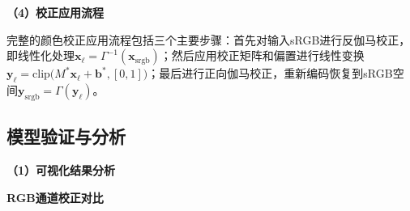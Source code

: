 \noindent\textbf{（4）校正应用流程}

完整的颜色校正应用流程包括三个主要步骤：首先对输入sRGB进行反伽马校正，即线性化处理$\mathbf{x}_\ell = \Gamma^{-1}(\mathbf{x}_{\mathrm{srgb}})$；然后应用校正矩阵和偏置进行线性变换$\mathbf{y}_\ell = \mathrm{clip}\!\bigl(M^*\mathbf{x}_\ell+\mathbf{b}^*,[0,1]\bigr)$；最后进行正向伽马校正，重新编码恢复到sRGB空间$\mathbf{y}_{\mathrm{srgb}}=\Gamma(\mathbf{y}_\ell)$。

\subsection[\hspace{-2pt}模型验证与分析]{{\heiti{}\hspace{-8pt}模型验证与分析}}\label{subsec:3-validation}

\noindent\textbf{（1）可视化结果分析}

 \textbf{RGB通道校正对比}

